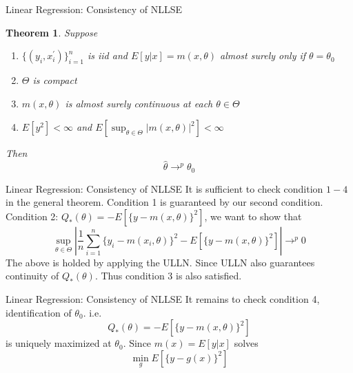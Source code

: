 \documentclass{beamer}
\newtheorem{thm}{Theorem}[subsection]
\begin{document}
\begin{frame}{Linear Regression: Consistency of NLLSE}
	\begin{thm}
		Suppose 
		\begin{enumerate}
				\item $\{(y_i,x^{'}_i)\}^n_{i=1}$ is iid and $E[y|x] = m(x,\theta)$ almost surely only if $\theta = \theta_0$
			\item $\Theta$ is compact
			\item $m(x,\theta)$ is almost surely continuous at each $\theta \in \Theta$
			\item $E[y^{2}] < \infty$ and $E[\sup_{\theta \in \Theta} |m(x,\theta)|^{2}] < \infty$
		\end{enumerate}
		Then 
		\[\hat{\theta} \rightarrow^p \theta_0\]
	\end{thm}
\end{frame}

\begin{frame}{Linear Regression: Consistency of NLLSE}
	It is sufficient to check condition $1-4$ in the general theorem. Condition 1 is guaranteed by our second condition. \\
	Condition 2: $Q_*(\theta) = - E[\{y - m(x,\theta)\}^2]$, we want to show that 
	\[\sup_{\theta \in \Theta} | \frac{1}{n} \sum^n_{i=1}\{y_i - m(x_i,\theta)\}^2 - E[\{y - m(x,\theta)\}^2]| \rightarrow^p 0\]
	The above is holded by applying the ULLN. Since ULLN also guarantees continuity of $Q_*(\theta)$. Thus condition 3 is also satisfied.
\end{frame}
\begin{frame}{Linear Regression: Consistency of NLLSE}
	It remains to check condition 4, identification of $\theta_0$. i.e.
	\[Q_*(\theta) = - E[\{y - m(x,\theta)\}^2]\]
	is uniquely maximized at $\theta_0$. Since $m(x) = E[y|x]$ solves 
	\[\min_g E[\{y - g(x)\}^2]\]
\end{frame}
\end{document}
